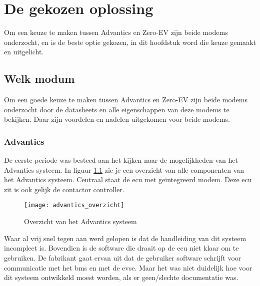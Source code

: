 \chapter{De gekozen oplossing}
\label{De_gekozen_oplossing}

Om een keuze te maken tussen Advantics en Zero-EV zijn beide modems onderzocht,
en is de beste optie gekozen, in dit hoofdstuk word die keuze gemaakt en
uitgelicht.

\section{Welk modum}

Om een goede keuze te maken tussen Advantics en Zero-EV zijn beide modems
onderzocht door de datasheets en alle eigenschappen van deze modems te
bekijken. Daar zijn voordelen en nadelen uitgekomen voor beide modems.

\subsection{Advantics}

De eerste periode was besteed aan het kijken naar de mogelijkheden van het
Advantics systeem. In figuur \ref{fig:advantics_overzicht} zie je een overzicht
van alle componenten van het Advantics systeem. Centraal staat de \ac{ecu} met
geïntegreerd modem. Deze \ac{ecu} zit is ook gelijk de contactor controller.

\begin{figure}[h]
    \centering
    \texttt{[image: advantics\_overzicht]}
    \caption{Overzicht van het Advantics systeem}
    \label{fig:advantics_overzicht}
\end{figure}

Waar al vrij snel tegen aan werd gelopen is dat de handleiding van dit systeem
incompleet is. Bovendien is de software die draait op de \ac{ecu} niet klaar om
te gebruiken. De fabrikant gaat ervan uit dat de gebruiker software schrijft
voor communicatie met het \ac{bms} en met de \ac{evse}. Maar het was niet
duidelijk hoe voor dit systeem ontwikkeld moest worden, als er geen/slechte
documentatie was.

